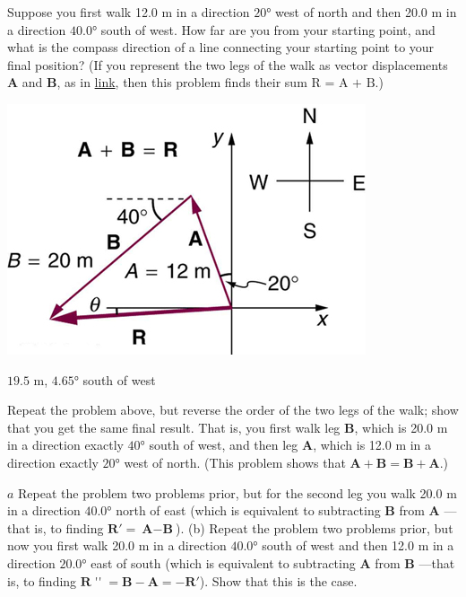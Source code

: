 \documentclass[
]{book}
\begin{document}
\hypertarget{fs-id1165298797729}{}
\leavevmode{}%
Suppose you first walk 12.0 m in a direction \(\text{20°}{}\) west of
north and then 20.0 m in a direction \(\text{40.0°}{}\) south of west. How
far are you from your starting point, and what is the compass direction
of a line connecting your starting point to your final position? (If you
represent the two legs of the walk as vector displacements
\(\mathbf{A}{}\) and \(\mathbf{B}{}\), as in
\protect\hyperlink{import-auto-id1165296430663}{link}, then this
problem finds their sum \(\text{R~=~A~+~B}{}\).)

\includegraphics{images/Figure_03_02_22a.jpg}

\leavevmode{}%
\({\text{19}\text{.}\text{5\ m}}{}\), \({4\text{.}\text{65°}}{}\) south of
west

\hypertarget{fs-id1165298849088}{}
\leavevmode{}%
Repeat the problem above, but reverse the order of the two legs of the
walk; show that you get the same final result. That is, you first walk
leg \(\mathbf{B}{}\), which is 20.0 m in a direction exactly
\(\text{40°}{}\) south of west, and then leg \(\mathbf{A}{}\), which is 12.0
m in a direction exactly \(\text{20°}{}\) west of north. (This problem
shows that \({{\mathbf{A} + \mathbf{B}} = {\mathbf{B} + \mathbf{A}}}{}\).)

\hypertarget{fs-id1165298560552}{}
\leavevmode{}%
\(a\) Repeat the problem two problems prior, but for the second leg you
walk 20.0 m in a direction \(\text{40.0°}{}\) north of east (which is
equivalent to subtracting \(\textbf{B}{}\) from \(\mathbf{A}{}\) ---that is,
to finding \({{\textbf{R}\prime} = {\textbf{A} - \textbf{B}}}{}\)). (b)
Repeat the problem two problems prior, but now you first walk 20.0 m in
a direction \(\text{40.0°}{}\) south of west and then 12.0 m in a
direction \(\text{20.0°}{}\) east of south (which is equivalent to
subtracting \(\textbf{A}{}\) from \(\textbf{B}{}\) ---that is, to finding
\({\textbf{R}\operatorname{\prime\prime} = \textbf{B} - \textbf{A} = - \textbf{R}\prime}{}\)).
Show that this is the case.
\end{document}
